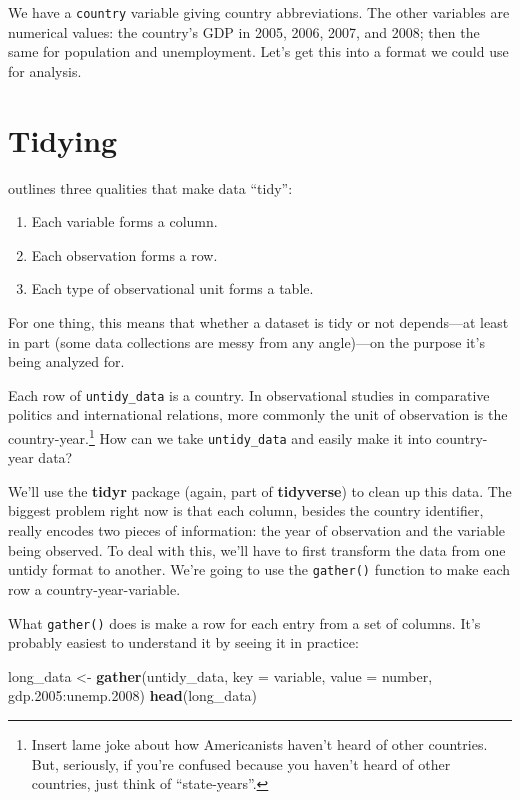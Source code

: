 \documentclass[12pt,oneside,openany]{book}
\newenvironment{Shaded}{\begin{snugshade}}{\end{snugshade}}
\newcommand{\KeywordTok}[1]{\textcolor[rgb]{0.13,0.29,0.53}{\textbf{{#1}}}}
\newcommand{\DataTypeTok}[1]{\textcolor[rgb]{0.13,0.29,0.53}{{#1}}}
\newcommand{\FloatTok}[1]{\textcolor[rgb]{0.00,0.00,0.81}{{#1}}}
\newcommand{\StringTok}[1]{\textcolor[rgb]{0.31,0.60,0.02}{{#1}}}
\newcommand{\NormalTok}[1]{{#1}}
\providecommand{\tightlist}{%
  \setlength{\itemsep}{0pt}\setlength{\parskip}{0pt}}
\let\rmarkdownfootnote\footnote%
\def\footnote{\protect\rmarkdownfootnote}
\begin{document}
We have a \texttt{country} variable giving country abbreviations. The
other variables are numerical values: the country's GDP in 2005, 2006,
2007, and 2008; then the same for population and unemployment. Let's get
this into a format we could use for analysis.

\section{Tidying}\label{tidying}

\citet{Wickham:2014vp} outlines three qualities that make data ``tidy'':

\begin{enumerate}
\def\labelenumi{\arabic{enumi}.}
\tightlist
\item
  Each variable forms a column.
\item
  Each observation forms a row.
\item
  Each type of observational unit forms a table.
\end{enumerate}

For one thing, this means that whether a dataset is tidy or not
depends---at least in part (some data collections are messy from any
angle)---on the purpose it's being analyzed for.

Each row of \texttt{untidy\_data} is a country. In observational studies
in comparative politics and international relations, more commonly the
unit of observation is the country-year.\footnote{Insert lame joke about
  how Americanists haven't heard of other countries. But, seriously, if
  you're confused because you haven't heard of other countries, just
  think of ``state-years''.} How can we take \texttt{untidy\_data} and
easily make it into country-year data?

We'll use the \textbf{tidyr} package (again, part of \textbf{tidyverse})
to clean up this data. The biggest problem right now is that each
column, besides the country identifier, really encodes two pieces of
information: the year of observation and the variable being observed. To
deal with this, we'll have to first transform the data from one untidy
format to another. We're going to use the \texttt{gather()} function to
make each row a country-year-variable.

What \texttt{gather()} does is make a row for each entry from a set of
columns. It's probably easiest to understand it by seeing it in
practice:

\begin{Shaded}
\begin{Highlighting}[]
\NormalTok{long_data <-}\StringTok{ }\KeywordTok{gather}\NormalTok{(untidy_data,}
                    \DataTypeTok{key =} \NormalTok{variable,}
                    \DataTypeTok{value =} \NormalTok{number,}
                    \NormalTok{gdp}\FloatTok{.2005}\NormalTok{:unemp}\FloatTok{.2008}\NormalTok{)}
\KeywordTok{head}\NormalTok{(long_data)}
\end{Highlighting}
\end{Shaded}
\end{document}
